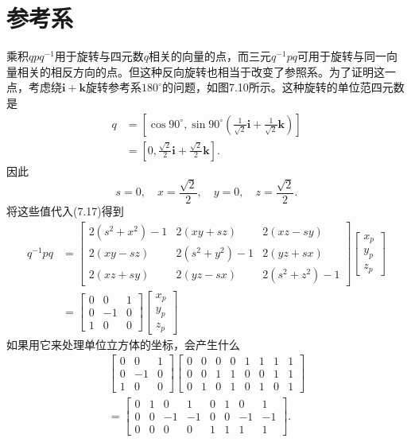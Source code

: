 \section{参考系}
乘积$q p q^{-1}$用于旋转与四元数$q$相关的向量的点，而三元$q^{-1} p q$可用于旋转与同一向量相关的相反方向的点。但这种反向旋转也相当于改变了参照系。为了证明这一点，考虑绕$\mathbf{i}+\mathbf{k}$旋转参考系$180^{\circ}$的问题，如图7.10所示。这种旋转的单位范四元数是
$$
\begin{aligned}
q & =\left[\cos 90^{\circ}, \sin 90^{\circ}\left(\frac{1}{\sqrt{2}} \mathbf{i}+\frac{1}{\sqrt{2}} \mathbf{k}\right)\right] \\
& =\left[0, \frac{\sqrt{2}}{2} \mathbf{i}+\frac{\sqrt{2}}{2} \mathbf{k}\right] .
\end{aligned}
$$
因此
$$
s=0, \quad x=\frac{\sqrt{2}}{2}, \quad y=0, \quad z=\frac{\sqrt{2}}{2} .
$$
将这些值代入(7.17)得到
$$
\begin{aligned}
q^{-1} p q & =\left[\begin{array}{ccc}
2\left(s^{2}+x^{2}\right)-1 & 2(x y+s z) & 2(x z-s y) \\
2(x y-s z) & 2\left(s^{2}+y^{2}\right)-1 & 2(y z+s x) \\
2(x z+s y) & 2(y z-s x) & 2\left(s^{2}+z^{2}\right)-1
\end{array}\right]\left[\begin{array}{l}
x_{p} \\
y_{p} \\
z_{p}
\end{array}\right] \\
& =\left[\begin{array}{ccc}
0 & 0 & 1 \\
0 & -1 & 0 \\
1 & 0 & 0
\end{array}\right]\left[\begin{array}{l}
x_{p} \\
y_{p} \\
z_{p}
\end{array}\right]
\end{aligned}
$$
如果用它来处理单位立方体的坐标，会产生什么
$$
\begin{gathered}
{\left[\begin{array}{ccc}
0 & 0 & 1 \\
0 & -1 & 0 \\
1 & 0 & 0
\end{array}\right]\left[\begin{array}{cccccccc}
0 & 0 & 0 & 0 & 1 & 1 & 1 & 1 \\
0 & 0 & 1 & 1 & 0 & 0 & 1 & 1 \\
0 & 1 & 0 & 1 & 0 & 1 & 0 & 1
\end{array}\right]} \\
=\left[\begin{array}{cccccccc}
0 & 1 & 0 & 1 & 0 & 1 & 0 & 1 \\
0 & 0 & -1 & -1 & 0 & 0 & -1 & -1 \\
0 & 0 & 0 & 0 & 1 & 1 & 1 & 1
\end{array}\right] .
\end{gathered}
$$
